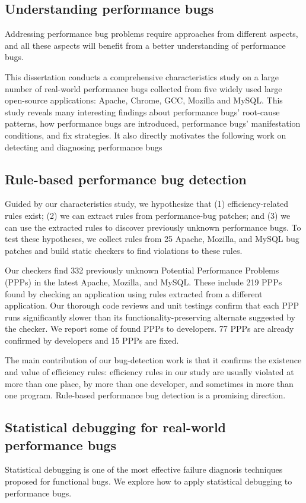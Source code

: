 \subsection{Understanding performance bugs}

Addressing performance bug problems require approaches from different aspects, 
and all these aspects will benefit from a better understanding of performance bugs. 

This dissertation conducts a comprehensive characteristics study on 
a large number of real-world performance bugs collected from five widely used large open-source applications: 
Apache, Chrome, GCC, Mozilla and MySQL. 
This study reveals many interesting findings about performance bugs' root-cause patterns, 
how performance bugs are introduced, performance bugs' manifestation conditions, and fix strategies. 
It also directly motivates the following work on detecting and diagnosing performance bugs

\subsection{Rule-based performance bug detection}

Guided by our characteristics study, we hypothesize that 
(1) efficiency-related rules exist; 
(2) we can extract rules from performance-bug patches; 
and (3) we can use the extracted rules to discover previously unknown performance bugs. 
To test these hypotheses, we collect rules from 25 Apache, Mozilla, and MySQL bug patches 
and build static checkers to find violations to these rules.

Our checkers find 332 previously unknown Potential Performance Problems (PPPs) 
in the latest Apache, Mozilla, and MySQL. 
These include 219 PPPs found by checking an application using rules extracted from a different application. 
Our thorough code reviews and unit testings confirm that each PPP runs significantly slower 
than its functionality-preserving alternate suggested by the checker. 
We report some of found PPPs to developers. 77 PPPs are already confirmed by developers and 15 PPPs are fixed.  

The main contribution of our bug-detection work is that it 
confirms the existence and value of efficiency rules: 
efficiency rules in our study are usually violated at more than one place, 
by more than one developer, 
and sometimes in more than one program. 
Rule-based performance bug detection is a promising direction. 

\subsection{Statistical debugging for real-world performance bugs}
Statistical debugging is one of the most effective failure diagnosis techniques proposed for functional bugs. 
We explore how to apply statistical debugging to performance bugs. 

